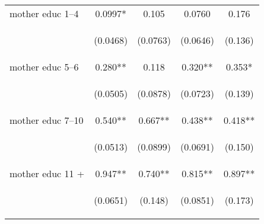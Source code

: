 \documentclass{article}[11pt,subeqn]
\begin{document}
\begin{spacing}{1.5}
\begin{table}[ht]
\begin{center}
\begin{tabular}{lcccc}
mother educ 1--4 & 0.0997* & 0.105 & 0.0760 & 0.176 \\
\vspace{4pt} & \begin{footnotesize}(0.0468)\end{footnotesize} & \begin{footnotesize}(0.0763)\end{footnotesize} & \begin{footnotesize}(0.0646)\end{footnotesize} & \begin{footnotesize}(0.136)\end{footnotesize} \\
mother educ 5--6 & 0.280** & 0.118 & 0.320** & 0.353* \\
\vspace{4pt} & \begin{footnotesize}(0.0505)\end{footnotesize} & \begin{footnotesize}(0.0878)\end{footnotesize} & \begin{footnotesize}(0.0723)\end{footnotesize} & \begin{footnotesize}(0.139)\end{footnotesize} \\
mother educ 7--10 & 0.540** & 0.667** & 0.438** & 0.418** \\
\vspace{4pt} & \begin{footnotesize}(0.0513)\end{footnotesize} & \begin{footnotesize}(0.0899)\end{footnotesize} & \begin{footnotesize}(0.0691)\end{footnotesize} & \begin{footnotesize}(0.150)\end{footnotesize} \\
mother educ 11 + & 0.947** & 0.740** & 0.815** & 0.897** \\
\vspace{4pt} & \begin{footnotesize}(0.0651)\end{footnotesize} & \begin{footnotesize}(0.148)\end{footnotesize} & \begin{footnotesize}(0.0851)\end{footnotesize} & \begin{footnotesize}(0.173)\end{footnotesize} \\

\end{tabular}
\end{center}
\end{table}
\end{spacing}
\end{document}
